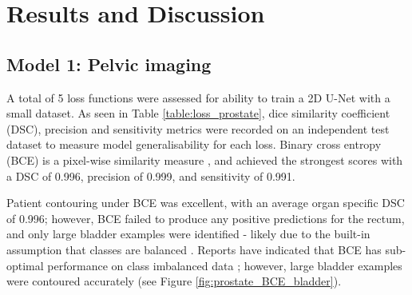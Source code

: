 \chapter{Results and Discussion}
\label{ch:results}

\section{Model 1: Pelvic imaging}
A total of 5 loss functions were assessed for ability to train a 2D U-Net with a small dataset. As seen in Table \ref{table:loss_prostate}, dice similarity coefficient (DSC), precision and sensitivity metrics were recorded on an independent test dataset to measure model generalisability for each loss. Binary cross entropy (BCE) is a pixel-wise similarity measure \cite{Bertels2019},
and achieved the strongest scores with a DSC of 0.996, precision of 0.999, and sensitivity of 0.991. 

\newpage

Patient contouring under BCE was excellent,
with an average organ specific DSC of 0.996; however, BCE failed to produce any positive predictions for the rectum, and only large bladder examples were identified - likely due to the built-in assumption that classes are balanced \cite{Ronneberger_2015}. Reports have indicated that BCE has sub-optimal performance on class imbalanced data \cite{taghanaki2018}; however, large bladder examples were contoured accurately
(see Figure \ref{fig:prostate_BCE_bladder}).  


